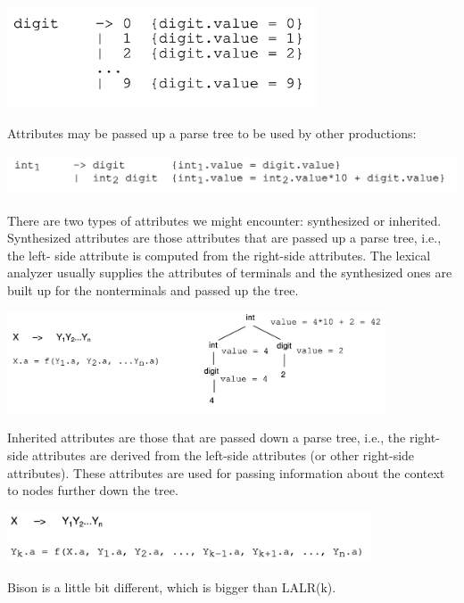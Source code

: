 \documentclass[a4paper]{article}
\theoremstyle{definition}
\begin{document}
\begin{center}
  \includegraphics[height=3cm]{img/Snipaste_2021-04-12_17-41-51.png}
  \end{center}
  Attributes may be passed up a parse tree to be used by other productions:
  
  \begin{center}
    \includegraphics[height=1.2cm]{img/Snipaste_2021-04-12_17-42-34.png}
    \end{center}
    
    There are two types of attributes we might encounter: synthesized or inherited. Synthesized attributes are those attributes that are passed up a parse tree, i.e., the left-
    side attribute is computed from the right-side attributes. The lexical analyzer usually supplies the attributes of terminals and the synthesized ones are built up for the nonterminals and passed up the tree.
    
    \begin{center}
      \includegraphics[height=3cm]{img/Snipaste_2021-04-12_17-43-29.png}
      \end{center}
      
      Inherited attributes are those that are passed down a parse tree, i.e., the right-side attributes are derived from the left-side attributes (or other right-side attributes). These attributes are used for passing information about the context to nodes further down the tree.
      \begin{center}
        \includegraphics[height=1.5cm]{img/Snipaste_2021-04-12_17-44-09.png}
        \end{center}
Bison is a little bit different, which is bigger than LALR(k).
\end{document}
